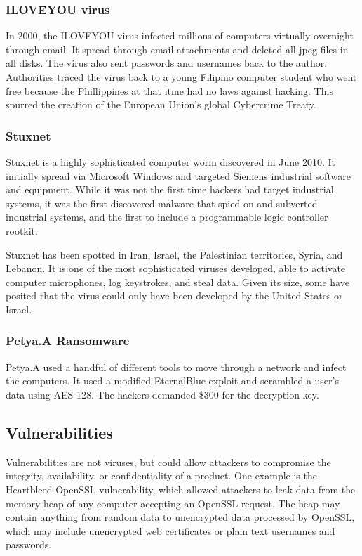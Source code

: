 \documentclass{math}
\begin{document}
\subsubsection*{ILOVEYOU virus}
In 2000, the ILOVEYOU virus infected millions of computers virtually overnight
through email. It spread through email attachments and deleted all jpeg files
in all disks. The virus also sent passwords and usernames back to the author.
Authorities traced the virus back to a young Filipino computer student who went
free because the Phillippines at that itme had no laws against hacking. This
spurred the creation of the European Union's global Cybercrime Treaty.

\subsubsection*{Stuxnet}
Stuxnet is a highly sophisticated computer worm discovered in June 2010. It
initially spread via Microsoft Windows and targeted Siemens industrial software
and equipment. While it was not the first time hackers had target industrial
systems, it was the first discovered malware that spied on and subverted
industrial systems, and the first to include a programmable logic controller
rootkit. \par
Stuxnet has been spotted in Iran, Israel, the Palestinian territories, Syria,
and Lebanon. It is one of the most sophisticated viruses developed, able to
activate computer microphones, log keystrokes, and steal data. Given its size,
some have posited that the virus could only have been developed by the United
States or Israel.

\subsubsection*{Petya.A Ransomware}
Petya.A used a handful of different tools to move through a network and infect
the computers. It used a modified EternalBlue exploit and scrambled a user's
data using AES-128. The hackers demanded \$300 for the decryption key.

\subsection*{Vulnerabilities}
Vulnerabilities are not viruses, but could allow attackers to compromise the
integrity, availability, or confidentiality of a product. One example is the
Heartbleed OpenSSL vulnerability, which allowed attackers to leak data from
the memory heap of any computer accepting an OpenSSL request. The heap may
contain anything from random data to unencrypted data processed by OpenSSL,
which may include unencrypted web certificates or plain text usernames and
passwords.
\end{document}
